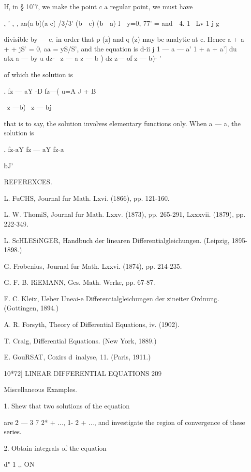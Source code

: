 If, in § 10'7, we make the point c a regular point, we must have

, ' , , aa(a-b)(a-c) /3/3' (b - c) (b - a) l\ \ y=0, 77' = and - 4. 1
\ Lv 1 j g

divisible by — c, in order that p (z) and q (z) may be analytic at c.
Hence a + a + + jS' = 0, aa = yS/S', and the equation is d-ii j 1 — a
— a' 1 + a + a'] du atx a — by u dz- \ z — a z — b ) dz z— of z — b)-
'

of which the solution is

. fz — aY -D fz—( u=A J + B



\ z —b) \ z — bj

that is to say, the solution involves elementary functions only. When
a — a, the solution is

. fz-aY fz — aY fz-a



bJ'



REFEREXCES.



L. FuCHS, Journal fur Math. Lxvi. (1866), pp. 121-160.

L. W. ThomiS, Journal fur Math. Lxxv. (1873), pp. 265-291, Lxxxvii.
(1879), pp. 222-349.

L. ScHLESiNGER, Handbuch der linearen Differentialgleichungen.
(Leipzig, 1895-1898.)

G. Frobenius, Journal fur Math. Lxxvi. (1874), pp. 214-235.

G. F. B. RiEMANN, Ges. Math. Werke, pp. 67-87.

F. C. Kleix, Ueber Uneai-e Differentialgleichungen der zineiter
Ordnung. (Gottingen, 1894.)

A. R. Forsyth, Theory of Differential Equations, iv. (1902).

T. Craig, Differential Equations. (New York, 1889.)

E. GouRSAT, Coxirs d\ inalyse, 11. (Paris, 1911.)



10*72] LINEAR DIFFERENTIAL EQUATIONS 209

Miscellaneous Examples.

1. Shew that two solutions of the equation

are 2 — 3 7 2* + ..., 1- 2 + ..., and investigate the region of
convergence of these series.

2. Obtain integrals of the equation

d" 1 ,, ON

